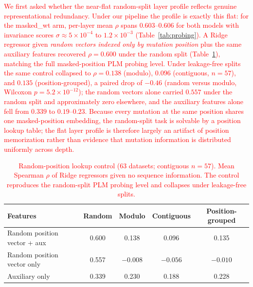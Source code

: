 \documentclass[11pt,a4paper]{article}
\newcommand{\rev}[1]{\textcolor{red}{#1}}
\begin{document}
\textcolor{red}{We first asked \rev{whether the near-flat random-split layer profile reflects
genuine representational redundancy. Under our pipeline the profile is
exactly this flat: for the masked\_wt
arm, per-layer mean $\rho$ spans
$0.603$--$0.606$ for both models with invariance scores $\sigma \approx 5 \times
10^{-4}$ to $1.2 \times 10^{-3}$ (Table~\ref{tab:probing}). A Ridge regressor given
\emph{random vectors indexed only by mutation position} plus the same auxiliary
features recovered $\rho = 0.600$ under the random split (Table~\ref{tab:control}),
matching the full masked-position PLM probing level. Under leakage-free splits the
same control collapsed to $\rho = 0.138$ (modulo), $0.096$ (contiguous, $n=57$), and
$0.135$ (position-grouped), a paired drop of $-0.46$ (random versus modulo, Wilcoxon
$p = 5.2 \times 10^{-12}$); the random vectors alone carried $0.557$ under the random
split and approximately zero elsewhere, and the auxiliary features alone fell from
$0.339$ to $0.19$--$0.23$. Because every mutation at the same position shares one
masked-position embedding, the random-split task is solvable by a position lookup
table; the flat layer profile is therefore largely an artifact of position
memorization rather than evidence that mutation information is distributed uniformly
across depth.}}

\begin{table}[ht]
\centering
\caption{\rev{Random-position lookup control (63 datasets; contiguous $n = 57$).
Mean Spearman $\rho$ of Ridge regressors given no sequence information. The control
reproduces the random-split PLM probing level and collapses under leakage-free
splits.}}
\label{tab:control}
\begin{tabular}{lcccc}
\toprule
Features & Random & Modulo & Contiguous & Position-grouped \\
\midrule
Random position vector + aux & 0.600 & 0.138 & 0.096 & 0.135 \\
Random position vector only  & 0.557 & $-0.008$ & $-0.056$ & $-0.010$ \\
Auxiliary only               & 0.339 & 0.230 & 0.188 & 0.228 \\
\bottomrule
\end{tabular}
\end{table}
\end{document}
